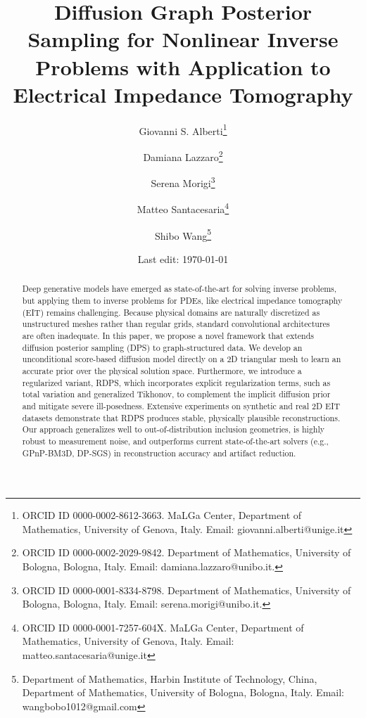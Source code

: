 \documentclass[a4paper,11pt]{article}
\theoremstyle{definition}
\theoremstyle{plain}
\theoremstyle{remark}
\begin{document}
\title{Diffusion Graph Posterior Sampling for Nonlinear Inverse Problems with Application to Electrical Impedance Tomography}


\date{Last edit:  \today}

 

\author{
 Giovanni S. Alberti\thanks{ORCID ID 0000-0002-8612-3663. MaLGa Center, Department of Mathematics, University of Genova, Italy. 
    Email: giovanni.alberti@unige.it }
\and
Damiana Lazzaro\thanks{ORCID ID 0000-0002-2029-9842. Department of Mathematics, University of Bologna, Bologna, Italy. Email: damiana.lazzaro@unibo.it. }
      \and
    Serena Morigi\thanks{ORCID ID 0000-0001-8334-8798. Department of Mathematics, University of Bologna, Bologna, Italy.
   Email: serena.morigi@unibo.it.}
  \and
   Matteo Santacesaria\thanks{ORCID ID 0000-0001-7257-604X. MaLGa Center, Department of Mathematics, University of Genova, Italy. 
  	Email: matteo.santacesaria@unige.it}
     \and
    Shibo Wang\thanks{Department of Mathematics, Harbin Institute of Technology, China, Department of Mathematics, University of Bologna, Bologna, Italy. 
     	Email: wangbobo1012@gmail.com }
}
\date{ }

\maketitle


\begin{abstract}
Deep generative models have emerged as state-of-the-art for solving inverse problems, but applying them to inverse problems for PDEs, like electrical impedance tomography (EIT) remains challenging. Because physical domains are naturally discretized as unstructured meshes rather than regular grids, standard convolutional architectures are often inadequate. In this paper, we propose a novel framework that extends diffusion posterior sampling (DPS) to graph-structured data. We develop an unconditional score-based diffusion model directly on a 2D triangular mesh to learn an accurate prior over the physical solution space. Furthermore, we introduce a regularized variant, RDPS, which incorporates explicit regularization terms, such as total variation and generalized Tikhonov, to complement the implicit diffusion prior and mitigate severe ill-posedness. Extensive experiments on synthetic and real 2D EIT datasets demonstrate that RDPS produces stable, physically plausible reconstructions. Our approach generalizes well to out-of-distribution inclusion geometries, is highly robust to measurement noise, and outperforms current state-of-the-art solvers (e.g., GPnP-BM3D, DP-SGS) in reconstruction accuracy and artifact reduction.
\end{abstract} 
\end{document}
